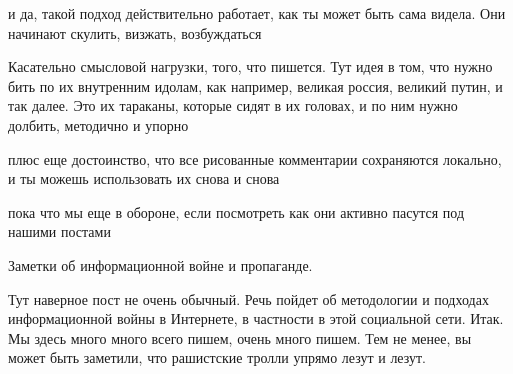 и да, такой подход действительно работает, как ты может быть сама видела. Они
начинают скулить, визжать, возбуждаться

Касательно смысловой нагрузки, того, что пишется. Тут идея в том, что нужно
бить по их внутренним идолам, как например, великая россия, великий путин, и
так далее. Это их тараканы, которые сидят в их головах, и по ним нужно долбить,
методично и упорно

плюс еще достоинство, что все рисованные комментарии сохраняются локально, и ты
можешь использовать их снова и снова

пока что мы еще в обороне, если посмотреть как они активно пасутся под нашими
постами

Заметки об информационной войне и пропаганде.

Тут наверное пост не очень обычный. Речь пойдет об методологии и подходах
информационной войны в Интернете, в частности в этой социальной сети. Итак. Мы
здесь много много всего пишем, очень много пишем. Тем не менее, вы может быть
заметили, что рашистские тролли упрямо лезут и лезут.
